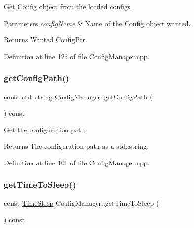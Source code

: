 Get \hyperlink{classcfg_1_1_config}{Config} object from the loaded configs. 


\begin{DoxyParams}{Parameters}
{\em config\+Name} & Name of the \hyperlink{classcfg_1_1_config}{Config} object wanted.\\
\hline
\end{DoxyParams}
\begin{DoxyReturn}{Returns}
Wanted Config\+Ptr. 
\end{DoxyReturn}


Definition at line 126 of file Config\+Manager.\+cpp.

\mbox{\label{classcfg_1_1_config_manager_af80e94a2a93aa7bb16c2fca5249936ac}} 
\subsubsection{\texorpdfstring{get\+Config\+Path()}{getConfigPath()}}
{\footnotesize\ttfamily const std\+::string Config\+Manager\+::get\+Config\+Path (\begin{DoxyParamCaption}{ }\end{DoxyParamCaption}) const\hspace{0.3cm}{\ttfamily [noexcept]}}



Get the configuration path. 

\begin{DoxyReturn}{Returns}
The configuration path as a std\+::string. 
\end{DoxyReturn}


Definition at line 101 of file Config\+Manager.\+cpp.

\mbox{\label{classcfg_1_1_config_manager_a992557430937cec5387d84d44c721f7c}} 
\subsubsection{\texorpdfstring{get\+Time\+To\+Sleep()}{getTimeToSleep()}}
{\footnotesize\ttfamily const \hyperlink{namespacecfg_ab1a8f7060b6dfea6111c4449e81c6f8c}{Time\+Sleep} Config\+Manager\+::get\+Time\+To\+Sleep (\begin{DoxyParamCaption}{ }\end{DoxyParamCaption}) const\hspace{0.3cm}{\ttfamily [noexcept]}}



